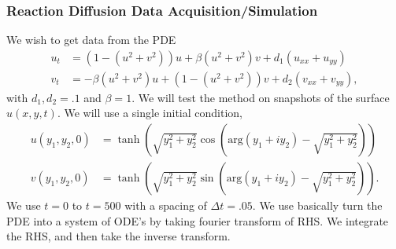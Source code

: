 \documentclass[12pt]{article}
\begin{document}
\subsubsection{Reaction Diffusion Data Acquisition/Simulation}
We wish to get data from the PDE
\begin{align*}
    u_t &= \left(1-(u^2+v^2) \right)u + \beta(u^2+v^2)v + d_1(u_{xx}+u_{yy})\\
    v_t &= -\beta(u^2+v^2)u + \left(1-(u^2+v^2)\right)v + d_2(v_{xx}+v_{yy}),
\end{align*}
with $d_1,d_2=.1$ and $\beta = 1$.
We will test the method on snapshots of the surface $u(x,y,t)$.
We will use a single initial condition,
\begin{align*}
    u(y_1,y_2,0)&= \tanh\left(\sqrt{y_1^2+y_2^2}\cos\left(\text{arg}(y_1+iy_2)-\sqrt{y_1^2+y_2^2}\right)\right)\\
    v(y_1,y_2,0) &= \tanh\left(\sqrt{y_1^2+y_2^2}\sin\left(\text{arg}(y_1+iy_2)-\sqrt{y_1^2+y_2^2}\right)\right).
\end{align*}
We use $t=0$ to $t=500$ with a spacing of $\Delta t = .05$.
We use basically turn the PDE into a system of ODE's by taking fourier transform of RHS. We integrate the RHS, and then take the inverse transform.
\end{document}
